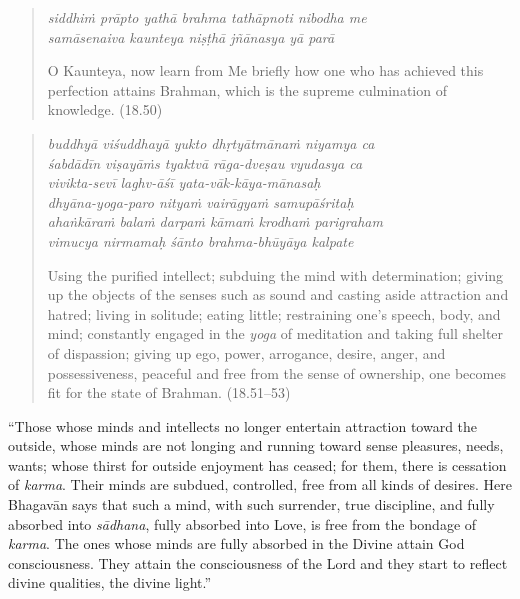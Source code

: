 \documentclass[12pt, twoside, openright]{memoir}
\begin{document}
\par
\begin{verse}
\textit{siddhiṁ prāpto yathā brahma tathāpnoti nibodha me} \\
\textit{samāsenaiva kaunteya niṣṭhā jñānasya yā parā}

\noindent O Kaunteya, now learn from Me briefly how one who has achieved this perfection attains Brahman, which is the supreme culmination of knowledge. (18.50)
\end{verse}
\par



\par
\begin{verse}
\textit{buddhyā viśuddhayā yukto dhṛtyātmānaṁ niyamya ca} \\
\textit{śabdādīn viṣayāṁs tyaktvā rāga-dveṣau vyudasya ca} \\
\textit{vivikta-sevī laghv-āśī yata-vāk-kāya-mānasaḥ} \\
\textit{dhyāna-yoga-paro nityaṁ vairāgyaṁ samupāśritaḥ} \\
\textit{ahaṅkāraṁ balaṁ darpaṁ kāmaṁ krodhaṁ parigraham} \\
\textit{vimucya nirmamaḥ śānto brahma-bhūyāya kalpate}

\noindent Using the purified intellect; subduing the mind with determination; giving up the objects of the senses such as sound and casting aside attraction and hatred; living in solitude; eating little; restraining one's speech, body, and mind; constantly engaged in the \textit{yoga} of meditation and taking full shelter of dispassion; giving up ego, power, arrogance, desire, anger, and possessiveness, peaceful and free from the sense of ownership, one becomes fit for the state of Brahman. (18.51–53)
\end{verse}
\par


\enquote{Those whose minds and intellects no longer entertain attraction toward the outside, whose minds are not longing and running toward sense pleasures, needs, wants; whose thirst for outside enjoyment has ceased; for them, there is cessation of \textit{karma}. Their minds are subdued, controlled, free from all kinds of desires. Here Bhagavān says that such a mind, with such surrender, true discipline, and fully absorbed into \textit{sādhana}, fully absorbed into Love, is free from the bondage of \textit{karma}. The ones whose minds are fully absorbed in the Divine attain God consciousness. They attain the consciousness of the Lord and they start to reflect divine qualities, the divine light.}
\end{document}
